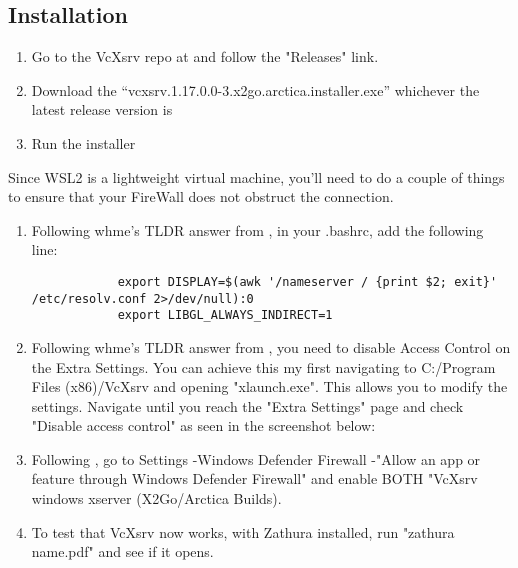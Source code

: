 \subsection{Installation}
\begin{enumerate}
    \item Go to the VcXsrv repo at \cite{articaproject2019vcxsrv} and follow the
        "Releases" link.
    \item Download the ``vcxsrv.1.17.0.0-3.x2go.arctica.installer.exe''
        whichever the latest release version is
    \item Run the installer
\end{enumerate}
Since WSL2 is a lightweight virtual machine, you'll need to do a couple of
things to ensure that your FireWall does not obstruct the connection.
\begin{enumerate}
    \item Following whme's TLDR answer from \cite{whme2020how}, in your .bashrc,
        add the following line:
        \begin{lstlisting}
            export DISPLAY=$(awk '/nameserver / {print $2; exit}' /etc/resolv.conf 2>/dev/null):0
            export LIBGL_ALWAYS_INDIRECT=1
        \end{lstlisting}
    \item Following whme's TLDR answer from \cite{whme2020how}, you need to
        disable Access Control on the Extra Settings. You can achieve this my
        first navigating to C:/Program Files (x86)/VcXsrv and opening
        "xlaunch.exe". This allows you to modify the settings. Navigate until
        you reach the "Extra Settings" page and check "Disable access control"
        as seen in the screenshot below:
    \item Following \cite{alextsil2020steps}, go to Settings -\trangle Windows
        Defender Firewall -\trangle "Allow an app or feature through Windows
        Defender Firewall" and enable BOTH "VcXsrv windows xserver (X2Go/Arctica
        Builds).
    \item To test that VcXsrv now works, with Zathura installed, run "zathura
        name.pdf" and see if it opens.
\end{enumerate}

